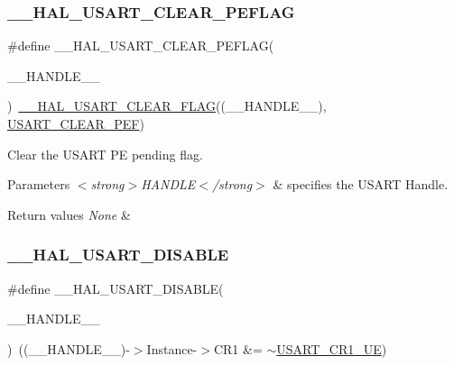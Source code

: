 \subsubsection{\texorpdfstring{\+\_\+\+\_\+\+H\+A\+L\+\_\+\+U\+S\+A\+R\+T\+\_\+\+C\+L\+E\+A\+R\+\_\+\+P\+E\+F\+L\+AG}{\_\_HAL\_USART\_CLEAR\_PEFLAG}}
{\footnotesize\ttfamily \#define \+\_\+\+\_\+\+H\+A\+L\+\_\+\+U\+S\+A\+R\+T\+\_\+\+C\+L\+E\+A\+R\+\_\+\+P\+E\+F\+L\+AG(\begin{DoxyParamCaption}\item[{}]{\+\_\+\+\_\+\+H\+A\+N\+D\+L\+E\+\_\+\+\_\+ }\end{DoxyParamCaption})~\hyperlink{group___u_s_a_r_t___exported___macros_gaff3cb6ff740b240764e7844eaf3d6807}{\+\_\+\+\_\+\+H\+A\+L\+\_\+\+U\+S\+A\+R\+T\+\_\+\+C\+L\+E\+A\+R\+\_\+\+F\+L\+AG}((\+\_\+\+\_\+\+H\+A\+N\+D\+L\+E\+\_\+\+\_\+), \hyperlink{group___u_s_a_r_t___i_t___c_l_e_a_r___flags_gaf83c3d570a430dfd1a7e7a8b583736f2}{U\+S\+A\+R\+T\+\_\+\+C\+L\+E\+A\+R\+\_\+\+P\+EF})}



Clear the U\+S\+A\+RT PE pending flag. 


\begin{DoxyParams}{Parameters}
{\em $<$strong$>$\+H\+A\+N\+D\+L\+E$<$/strong$>$} & specifies the U\+S\+A\+RT Handle. \\
\hline
\end{DoxyParams}

\begin{DoxyRetVals}{Return values}
{\em None} & \\
\hline
\end{DoxyRetVals}
\mbox{\label{group___u_s_a_r_t___exported___macros_ga8cc760b7a382db42655d21a5edbfc227}} 
\subsubsection{\texorpdfstring{\+\_\+\+\_\+\+H\+A\+L\+\_\+\+U\+S\+A\+R\+T\+\_\+\+D\+I\+S\+A\+B\+LE}{\_\_HAL\_USART\_DISABLE}}
{\footnotesize\ttfamily \#define \+\_\+\+\_\+\+H\+A\+L\+\_\+\+U\+S\+A\+R\+T\+\_\+\+D\+I\+S\+A\+B\+LE(\begin{DoxyParamCaption}\item[{}]{\+\_\+\+\_\+\+H\+A\+N\+D\+L\+E\+\_\+\+\_\+ }\end{DoxyParamCaption})~((\+\_\+\+\_\+\+H\+A\+N\+D\+L\+E\+\_\+\+\_\+)-\/$>$Instance-\/$>$C\+R1 \&=  $\sim$\hyperlink{group___peripheral___registers___bits___definition_ga2bb650676aaae4a5203f372d497d5947}{U\+S\+A\+R\+T\+\_\+\+C\+R1\+\_\+\+UE})}



